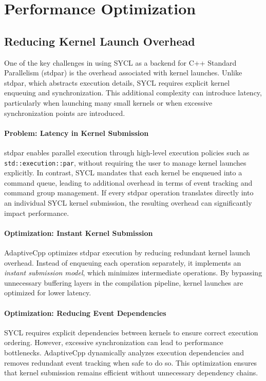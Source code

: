 \section{Performance Optimization}
\label{sec:performance_optimization}

\subsection{Reducing Kernel Launch Overhead}
\label{sec:kernel_launch_overhead}

One of the key challenges in using SYCL as a backend for C++ Standard Parallelism (stdpar) is the overhead
associated with kernel launches. Unlike stdpar, which abstracts execution details, SYCL requires explicit kernel
enqueuing and synchronization. This additional complexity can introduce latency, particularly when launching
many small kernels or when excessive synchronization points are introduced.

\paragraph{Problem: Latency in Kernel Submission}
stdpar enables parallel execution through high-level execution policies such as \texttt{std::execution::par},
without requiring the user to manage kernel launches explicitly. In contrast, SYCL mandates that each kernel
be enqueued into a command queue, leading to additional overhead in terms of event tracking and command
group management. If every stdpar operation translates directly into an individual SYCL kernel submission,
the resulting overhead can significantly impact performance.

\paragraph{Optimization: Instant Kernel Submission}
AdaptiveCpp optimizes stdpar execution by reducing redundant kernel launch overhead. Instead of enqueuing
each operation separately, it implements an \textit{instant submission model}, which minimizes intermediate
operations. By bypassing unnecessary buffering layers in the compilation pipeline, kernel launches are
optimized for lower latency.

\paragraph{Optimization: Reducing Event Dependencies}
SYCL requires explicit dependencies between kernels to ensure correct execution ordering. However, excessive
synchronization can lead to performance bottlenecks. AdaptiveCpp dynamically analyzes execution dependencies
and removes redundant event tracking when safe to do so. This optimization ensures that kernel submission
remains efficient without unnecessary dependency chains.

